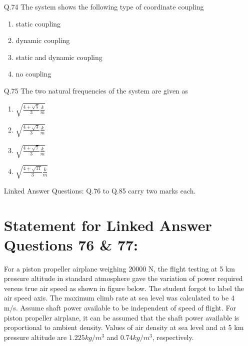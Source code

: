 \documentclass[journal]{IEEEtran}
\begin{document}
\begin{enumerate}

\item[Q.74]The system shows the following type of coordinate coupling
\begin{enumerate}
    \item static coupling
    \item dynamic coupling
    \item static and dynamic coupling
    \item no coupling\\
\end{enumerate}
\item[Q.75]The two natural frequencies of the system are given as
\begin{enumerate}
    \item $\sqrt{\frac{4+\sqrt{5}}{3}\frac{k}{m}}$
    \item $\sqrt{\frac{4+\sqrt{3}}{3}\frac{k}{m}}$
    \item $\sqrt{\frac{4+\sqrt{7}}{3}\frac{k}{m}}$
    \item $\sqrt{\frac{4+\sqrt{11}}{3}\frac{k}{m}}$
\end{enumerate}
Linked Answer Questions: Q.76 to Q.85 carry two marks each.
\section*{Statement for Linked Answer Questions 76 \& 77:}
For a piston propeller airplane weighing 20000 N, the flight testing at 5 km pressure altitude in standard atmosphere gave the variation of power required versus true air speed as shown in figure below. The student forgot to label the air speed axis. The maximum climb rate at sea level was calculated to be 4 m/s. Assume shaft power available to be independent of speed of flight. For piston propeller airplane, it can be assumed that the shaft power available is proportional to ambient density. Values of air density at sea level and at 5 km pressure altitude are $1.225 kg/m^3$ and $0.74 kg/m^3$, respectively.


\end{enumerate}
\end{document}
